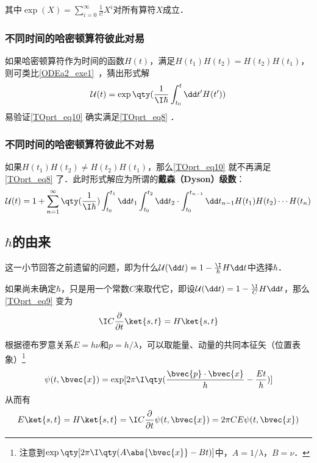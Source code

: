 其中$\exp(X)=\sum_{i=0}^\infty \frac{1}{i!}X^i$对所有算符$X$成立．



\subsubsection{不同时间的哈密顿算符彼此对易}

如果哈密顿算符作为时间的函数$H(t)$，满足$H(t_1)H(t_2)=H(t_2)H(t_1)$，则可类比\autoref{ODEa2_exe1}~，猜出形式解
\begin{equation}\label{TOprt_eq10}
\mathcal{U}(t)=\exp\qty(\frac{1}{\I\hbar}\int^t_{t_0}\dd t' H(t'))
\end{equation}
易验证\autoref{TOprt_eq10} 确实满足\autoref{TOprt_eq8} ．



\subsubsection{不同时间的哈密顿算符彼此不对易}

如果$H(t_1)H(t_2)\not=H(t_2)H(t_1)$，那么\autoref{TOprt_eq10} 就不再满足\autoref{TOprt_eq8} 了．此时形式解应为所谓的\textbf{戴森（Dyson）级数}：
\begin{equation}
\mathcal{U}(t) = 1+\sum_{n=1}^\infty \qty(\frac{1}{\I \hbar})\int^{t_1}_{t_0}\dd t_1\int^{t_2}_{t_0}\dd t_2\cdot \int^{t_{n-1}}_{t_0}\dd t_{n-1}H(t_1)H(t_2)\cdots H(t_n)
\end{equation}


\subsection{$\hbar$的由来}\label{TOprt_sub1}

这一小节回答之前遗留的问题，即为什么$\mathcal{U}(\dd t) = 1-\frac{\I}{\hbar} H \dd t$中选择$\hbar$．

如果尚未确定$\hbar$，只是用一个常数$C$来取代它，即设$\mathcal{U}(\dd t) = 1-\frac{\I}{C} H \dd t$，那么\autoref{TOprt_eq9} 变为
\begin{equation}
\I C\frac{\partial}{\partial t}\ket{s, t}=H\ket{s, t}
\end{equation}

根据德布罗意关系$E=h\nu$和$p=h/\lambda$，可以取能量、动量的共同本征矢（位置表象）\footnote{注意到$\exp\qty[2\pi \I \qty(A\abs{\bvec{x}}-Bt)]$中，$A=1/\lambda$，$B=\nu$．}
\begin{equation}
\psi(t, \bvec{x})=\exp[2\pi\I\qty(\frac{\bvec{p}\cdot\bvec{x}}{h}-\frac{Et}{h})]
\end{equation}
从而有
\begin{equation}
E\ket{s, t}=H\ket{s, t}=\I C\frac{\partial}{\partial t}\psi(t, \bvec{x}) = 2\pi C E \psi(t, \bvec{x})
\end{equation}









